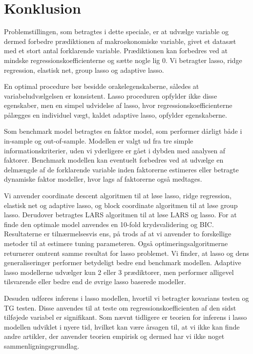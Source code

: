 \chapter{Konklusion}
Problemstillingen, som betragtes i dette speciale, er at udvælge variable og dermed forbedre prædiktionen af makroøkonomiske variable, givet et datasæt med et stort antal forklarende variable.
Prædiktionen kan forbedres ved at mindske regressionskoefficienterne og sætte nogle lig 0.
Vi betragter lasso, ridge regression, elastisk net, group lasso og adaptive lasso.

En optimal procedure bør besidde orakelegenskaberne, således at variabeludvælgelsen er konsistent.
Lasso proceduren opfylder ikke disse egenskaber, men en simpel udvidelse af lasso, hvor regressionskoefficienterne pålægges en individuel vægt, kaldet adaptive lasso, opfylder egenskaberne.

Som benchmark model betragtes en faktor model, som performer dårligt både i in-sample og out-of-sample.
Modellen er valgt ud fra tre simple informationskriterier, uden vi yderligere er gået i dybden med analysen af faktorer.
Benchmark modellen kan eventuelt forbedres ved at udvælge en delmængde af de forklarende variable inden faktorerne estimeres eller betragte dynamiske faktor modeller, hvor lags af faktorerne også medtages.

Vi anvender coordinate descent algoritmen til at løse lasso, ridge regression, elastisk net og adaptive lasso, og block coordinate algoritmen til at løse group lasso.
Derudover betragtes LARS algoritmen til at løse LARS og lasso.
For at finde den optimale model anvendes en 10-fold krydsvalidering og BIC.
Resultaterne er tilnærmelsesvis ens, på trods af at vi anvender to forskellige metoder til at estimere tuning parameteren. 
Også optimeringsalgoritmerne returnerer omtrent samme resultat for lasso problemet.
Vi finder, at lasso og dens generaliseringer performer betydeligt bedre end benchmark modellen.
Adaptive lasso modellerne udvælger kun 2 eller 3 prædiktorer, men performer alligevel tilsvarende eller bedre end de øvrige lasso baserede modeller.

Desuden udføres inferens i lasso modellen, hvortil vi betragter kovarians testen og TG testen.
Disse anvendes til at teste om regressionskoefficienten af den sidst tilføjede variabel er signifikant.
Som nævnt tidligere er teorien for inferens i lasso modellen udviklet i nyere tid, hvilket kan være årsagen til, at vi ikke kan finde andre artikler, der anvender teorien empirisk og dermed har vi ikke noget sammenligningsgrundlag.

